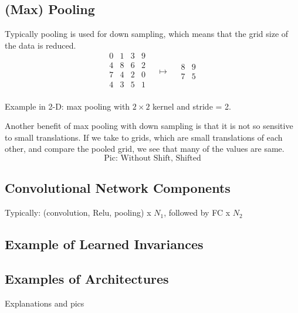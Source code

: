\documentclass[]{article}
\begin{document}
\subsection{(Max) Pooling}
Typically pooling is used for down sampling, which means that the grid size of
the data is reduced.
\[
\begin{array}{c|c|c|c}
  0 & 1 & 3 & 9\\
  \hline
  4 & 8 & 6 & 2\\
  \hline
  7 & 4 & 2 & 0\\
  \hline
  4 & 3 & 5 & 1\\
 \end{array}
 \quad \mapsto \quad
 \begin{array}{c|c}
   8 & 9\\
   \hline
   7 & 5
  \end{array}
 \]
\begin{center}Example in 2-D: max pooling with $2\times2$ kernel and stride = 2.\end{center}
Another benefit of max pooling with down sampling is that it is not so sensitive
to small translations. If we take to grids, which are small translations of each
other, and compare the pooled grid, we see that many of the values are same.
\[
\text{Pic: Without Shift, Shifted}
\]

\subsection{Convolutional Network Components}
Typically: (convolution, Relu, pooling) x $N_1$, followed by FC x $N_2$


\subsection{Example of Learned Invariances}


\subsection{Examples of Architectures}
Explanations and pics
\end{document}
